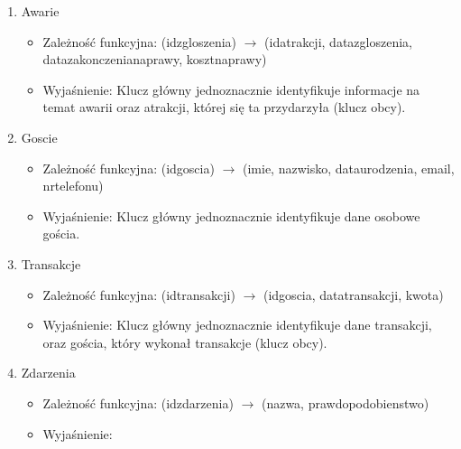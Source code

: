 \documentclass{article}
\begin{document}
\begin{enumerate}
\begin{itemize}
    \item Wyjaśnienie: \newline
    Tabela składa się z samego klucza głównego, który składa się z kluczy obcych.
\end{itemize}
\item Awarie 
\begin{itemize}
    \item Zależność funkcyjna: \newline
    (id\textunderscore zgloszenia) $\rightarrow$ (id\textunderscore atrakcji, data\textunderscore zgloszenia, data\textunderscore zakonczenia\textunderscore naprawy, koszt\textunderscore naprawy)
    \item Wyjaśnienie: \newline
    Klucz główny jednoznacznie identyfikuje informacje na temat awarii oraz atrakcji, której się ta przydarzyła (klucz obcy).
\end{itemize}
\item Goscie 
\begin{itemize}
    \item Zależność funkcyjna: \newline
    (id\textunderscore goscia) $\rightarrow$ (imie, nazwisko, data\textunderscore urodzenia, email, nr\textunderscore telefonu)
    \item Wyjaśnienie: \newline
    Klucz główny jednoznacznie identyfikuje dane osobowe gościa.
\end{itemize}
\item Transakcje 
\begin{itemize}
    \item Zależność funkcyjna: \newline
    (id\textunderscore transakcji) $\rightarrow$ (id\textunderscore goscia, data\textunderscore transakcji, kwota)
    \item Wyjaśnienie: \newline
    Klucz główny jednoznacznie identyfikuje dane transakcji, oraz gościa, który wykonał transakcje (klucz obcy).
\end{itemize}
\item Zdarzenia
\begin{itemize}
    \item Zależność funkcyjna: \newline
    (id\textunderscore zdarzenia) $\rightarrow$ (nazwa, prawdopodobienstwo)
    \item Wyjaśnienie: \newline

\end{itemize}
\end{enumerate}
\end{document}
